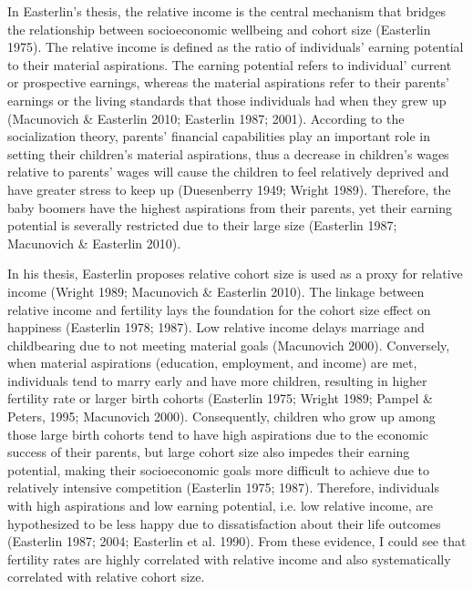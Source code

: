 In Easterlin’s thesis, the relative income is the central mechanism that bridges the relationship between socioeconomic wellbeing and cohort size (Easterlin 1975). The relative income is defined as the ratio of individuals’ earning potential to their material aspirations. The earning potential refers to individual’ current or prospective earnings, whereas the material aspirations refer to their parents’ earnings or the living standards that those individuals had when they grew up (Macunovich & Easterlin 2010; Easterlin 1987; 2001). According to the socialization theory, parents’ financial capabilities play an important role in setting their children’s material aspirations, thus a decrease in children’s wages relative to parents’ wages will cause the children to feel relatively deprived and have greater stress to keep up (Duesenberry 1949; Wright 1989). Therefore, the baby boomers have the highest aspirations from their parents, yet their earning potential is severally restricted due to their large size (Easterlin 1987; Macunovich & Easterlin 2010).

In his thesis, Easterlin proposes relative cohort size is used as a proxy for relative income (Wright 1989; Macunovich & Easterlin 2010). The linkage between relative income and fertility lays the foundation for the cohort size effect on happiness (Easterlin 1978; 1987). Low relative income delays marriage and childbearing due to not meeting material goals (Macunovich 2000). Conversely, when material aspirations (education, employment, and income) are met, individuals tend to marry early and have more children, resulting in higher fertility rate or larger birth cohorts (Easterlin 1975; Wright 1989; Pampel & Peters, 1995; Macunovich 2000). Consequently, children who grow up among those large birth cohorts tend to have high aspirations due to the economic success of their parents, but large cohort size also impedes their earning potential, making their socioeconomic goals more difficult to achieve due to relatively intensive competition (Easterlin 1975; 1987). Therefore, individuals with high aspirations and low earning potential, i.e. low relative income, are hypothesized to be less happy due to dissatisfaction about their life outcomes (Easterlin 1987; 2004; Easterlin et al. 1990). From these evidence, I could see that fertility rates are highly correlated with relative income and also systematically correlated with relative cohort size.

